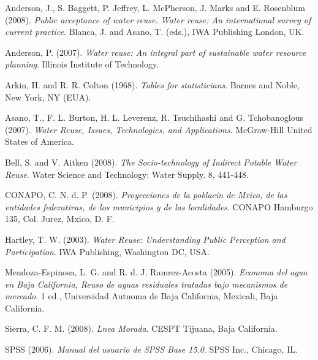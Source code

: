 \begin{thebibliography}{1} 

 Anderson, J., S. Baggett, P. Jeffrey, L. McPherson, J. Marks and E. Rosenblum (2008). {\em Public acceptance of water reuse. Water reuse: An international survey of current practice}. Blanca, J. and Asano, T. (eds.), IWA Publishing London, UK.

 Anderson, P. (2007). {\em Water reuse: An integral part of sustainable water resource planning}. Illinois Institute of Technology.

 Arkin, H. and R. R. Colton (1968). {\em Tables for statisticians}. Barnes and Noble, New York, NY (EUA).

 Asano, T., F. L. Burton, H. L. Leverenz, R. Tsuchihashi and G. Tchobanoglous (2007). {\em Water Reuse, Issues, Technologies, and Applications}. McGraw-Hill United States of America.

 Bell, S. and V. Aitken (2008). {\em The Socio-technology of Indirect Potable Water Reuse}. Water Science and Technology: Water Supply. 8, 441-448.

 CONAPO, C. N. d. P. (2008). {\em Proyecciones de la poblacin de Mxico, de las entidades federativas, de los municipios y de las localidades}. CONAPO Hamburgo 135, Col. Jurez, Mxico, D. F. 

 Hartley, T. W. (2003). {\em Water Reuse: Understanding Public Perception and Participation}. IWA Publishing, Washington DC, USA.

 Mendoza-Espinosa, L. G. and R. d. J. Ramrez-Acosta (2005). {\em Economa del agua en Baja California, Reuso de aguas residuales tratadas bajo mecanismos de mercado}. 1 ed., Universidad Autnoma de Baja California, Mexicali, Baja California.

 Sierra, C. F. M. (2008). {\em Lnea Morada}. CESPT Tijuana, Baja California.

 SPSS (2006). {\em Manual del usuario de SPSS Base 15.0}. SPSS Inc., Chicago, IL.

\end{thebibliography} 